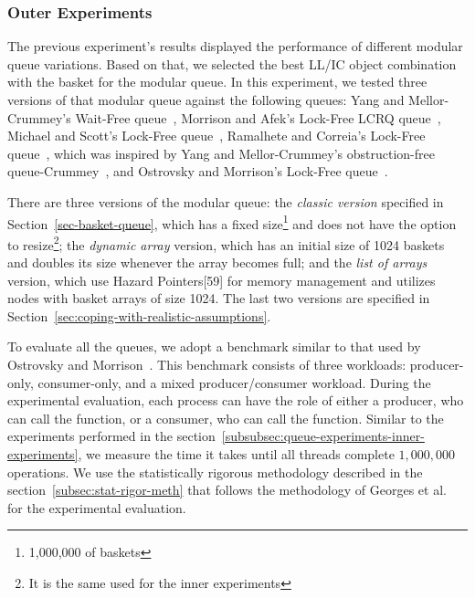 \subsubsection{\label{subsubsec:queue-experiments-outer-experiments}Outer Experiments}

The previous experiment's results displayed the performance of different modular queue variations. Based on that, we selected the best LL/IC object combination with the basket for the modular queue. In this experiment, we tested three versions of that modular queue against the following queues: Yang and Mellor-Crummey's Wait-Free queue~\cite{DBLP_conf_ppopp_YangM16}, Morrison and Afek's Lock-Free LCRQ queue~\cite{ppopp2013x86queues}, Michael and Scott's Lock-Free queue~\cite{DBLP_conf_podc_MichaelS96}, Ramalhete and Correia's Lock-Free queue~\cite{Ramalhete_Correia_MPMC_2016}, which was inspired by Yang and Mellor-Crummey's obstruction-free queue-Crummey~\cite{DBLP_conf_ppopp_YangM16}, and Ostrovsky and Morrison's Lock-Free queue~\cite{scalingconcurrent2020}.

There are three versions of the modular queue: the \textit{classic version} specified in Section~\ref{sec-basket-queue}, which has a fixed size\footnote{1,000,000 of baskets} and does not have the option to resize\footnote{It is the same used for the inner experiments}; the \textit{dynamic array} version, which has an initial size of 1024 baskets and doubles its size whenever the array becomes full; and the \textit{list of arrays} version, which use Hazard Pointers[59] for memory management and utilizes nodes with basket arrays of size 1024. The last two versions are specified in Section~\ref{sec:coping-with-realistic-assumptions}.

To evaluate all the queues, we adopt a benchmark similar to that used by Ostrovsky and Morrison~\cite{scalingconcurrent2020}. This benchmark consists of three workloads: producer-only, consumer-only, and a mixed producer/consumer workload. During the experimental evaluation, each process can have the role of either a producer, who can call the \Enq function, or a consumer, who can call the \Deq function. Similar to the experiments performed in the section~\ref{subsubsec:queue-experiments-inner-experiments}, we measure the time it takes until all threads complete \(1,000,000\) operations. We use the statistically rigorous methodology described in the section~\ref{subsec:stat-rigor-meth} that follows the methodology of Georges et al.~\cite{DBLP_conf_oopsla_GeorgesBE07} for the experimental evaluation.

